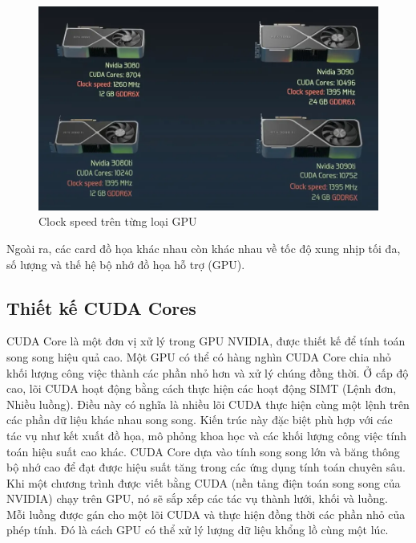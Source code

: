 \documentclass[a4paper]{article}
\begin{document}
\begin{figure}
    \centering
    \includegraphics[width=0.75\linewidth]{assets/gpu10.png}
    \caption{Clock speed trên từng loại GPU}
    \label{fig:enter-label}
\end{figure}
Ngoài ra, các card đồ họa khác nhau còn khác nhau về tốc độ xung nhịp tối đa, số lượng và thế hệ bộ nhớ đồ họa hỗ trợ (GPU).

\subsection{Thiết kế CUDA Cores}
CUDA Core là một đơn vị xử lý trong GPU NVIDIA, được thiết kế để tính toán song song hiệu quả cao. Một GPU có thể có hàng nghìn CUDA Core chia nhỏ khối lượng công việc thành các phần nhỏ hơn và xử lý chúng đồng thời.
Ở cấp độ cao, lõi CUDA hoạt động bằng cách thực hiện các hoạt động SIMT (Lệnh đơn, Nhiều luồng). Điều này có nghĩa là nhiều lõi CUDA thực hiện cùng một lệnh trên các phần dữ liệu khác nhau song song. Kiến trúc này đặc biệt phù hợp với các tác vụ như kết xuất đồ họa, mô phỏng khoa học và các khối lượng công việc tính toán hiệu suất cao khác.
CUDA Core dựa vào tính song song lớn và băng thông bộ nhớ cao để đạt được hiệu suất tăng trong các ứng dụng tính toán chuyên sâu.
Khi một chương trình được viết bằng CUDA (nền tảng điện toán song song của NVIDIA) chạy trên GPU, nó sẽ sắp xếp các tác vụ thành lưới, khối và luồng. Mỗi luồng được gán cho một lõi CUDA và thực hiện đồng thời các phần nhỏ của phép tính. Đó là cách GPU có thể xử lý lượng dữ liệu khổng lồ cùng một lúc.
    
\end{document}
